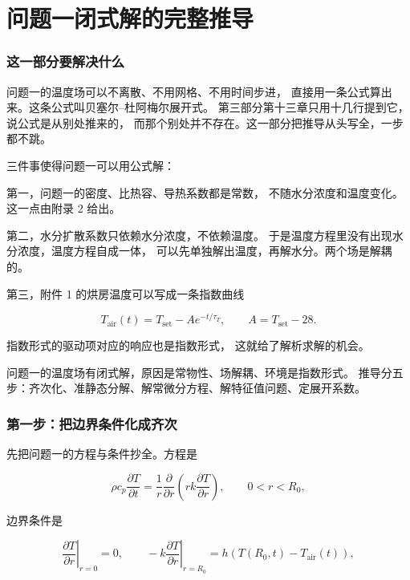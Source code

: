 \part{问题一闭式解的完整推导}

\section{这一部分要解决什么}

问题一的温度场可以不离散、不用网格、不用时间步进，
直接用一条公式算出来。这条公式叫贝塞尔--杜阿梅尔展开式。
第三部分第十三章只用十几行提到它，说公式是从别处推来的，
而那个别处并不存在。这一部分把推导从头写全，一步都不跳。

三件事使得问题一可以用公式解：

第一，问题一的密度、比热容、导热系数都是常数，
不随水分浓度和温度变化。这一点由附录 2 给出。

第二，水分扩散系数只依赖水分浓度，不依赖温度。
于是温度方程里没有出现水分浓度，温度方程自成一体，
可以先单独解出温度，再解水分。两个场是解耦的。

第三，附件 1 的烘房温度可以写成一条指数曲线

\begin{equation}
T_{\mathrm{air}}(t)=T_{\mathrm{set}}-A e^{-t/\tau_T},
\qquad A=T_{\mathrm{set}}-28 .
\label{eq:p6-air}
\end{equation}

指数形式的驱动项对应的响应也是指数形式，
这就给了解析求解的机会。

\begin{keypoint}
问题一的温度场有闭式解，原因是常物性、场解耦、环境是指数形式。
推导分五步：齐次化、准静态分解、解常微分方程、解特征值问题、定展开系数。
\end{keypoint}

\section{第一步：把边界条件化成齐次}

先把问题一的方程与条件抄全。方程是

\begin{equation}
\rho c_p\frac{\partial T}{\partial t}
=\frac{1}{r}\frac{\partial}{\partial r}\left(r k\frac{\partial T}{\partial r}\right),
\qquad 0<r<R_0 ,
\label{eq:p6-pde}
\end{equation}

边界条件是

\begin{equation}
\left.\frac{\partial T}{\partial r}\right|_{r=0}=0,
\qquad
-k\left.\frac{\partial T}{\partial r}\right|_{r=R_0}
=h\left(T(R_0,t)-T_{\mathrm{air}}(t)\right),
\label{eq:p6-bc}
\end{equation}

